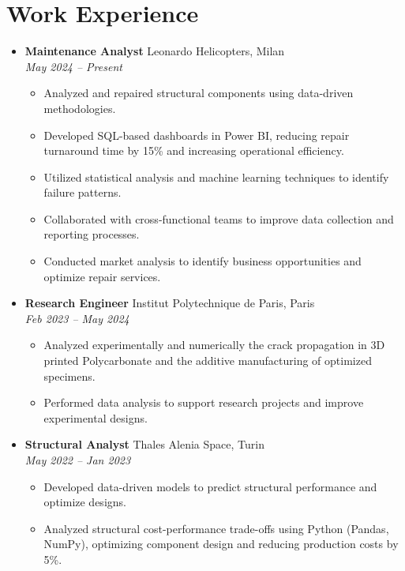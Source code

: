 \documentclass[letterpaper,10.5pt]{article}
\newcommand{\resumeEntry}[4]{
  \item\textbf{#1} \hfill #2\\
  \textit{#3} \hfill \textit{#4}
}
\newcommand{\resumeDescription}[1]{
  \vspace{-3pt}\begin{itemize}[leftmargin=0.2in]
    #1
  \end{itemize}
}
\begin{document}
\section*{Work Experience}
\begin{itemize}[leftmargin=0.2in]
    \resumeEntry{Maintenance Analyst}{Leonardo Helicopters, Milan}{May 2024 -- Present}{}
    \resumeDescription{
        \item Analyzed and repaired structural components using data-driven methodologies.
        \item Developed SQL-based dashboards in Power BI, reducing repair turnaround time by 15\% and increasing operational efficiency.
        \item Utilized statistical analysis and machine learning techniques to identify failure patterns.
        \item Collaborated with cross-functional teams to improve data collection and reporting processes.
        \item Conducted market analysis to identify business opportunities and optimize repair services.
    }
    \resumeEntry{Research Engineer}{Institut Polytechnique de Paris, Paris}{Feb 2023 -- May 2024}{}
    \resumeDescription{
        \item Analyzed experimentally and numerically the crack propagation in 3D printed Polycarbonate and the additive manufacturing of optimized specimens.
        \item Performed data analysis to support research projects and improve experimental designs.
    }
    \resumeEntry{Structural Analyst}{Thales Alenia Space, Turin}{May 2022 -- Jan 2023}{}
    \resumeDescription{
        \item Developed data-driven models to predict structural performance and optimize designs.
        \item Analyzed structural cost-performance trade-offs using Python (Pandas, NumPy), optimizing component design and reducing production costs by 5\%.
    }
\end{itemize}

\end{document}
